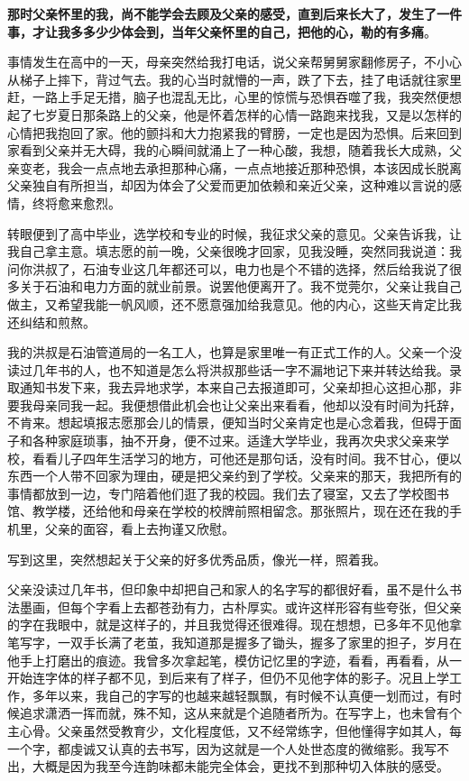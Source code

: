 \documentclass[UTF8,a4paper,8pt]{ctexbook}
\begin{document}
		\textbf{那时父亲怀里的我，尚不能学会去顾及父亲的感受，直到后来长大了，发生了一件事，才让我多多少少体会到，当年父亲怀里的自己，把他的心，勒的有多痛}。
		
		事情发生在高中的一天，母亲突然给我打电话，说父亲帮舅舅家翻修房子，不小心从梯子上摔下，背过气去。我的心当时就懵的一声，跌了下去，挂了电话就往家里赶，一路上手足无措，脑子也混乱无比，心里的惊慌与恐惧吞噬了我，我突然便想起了七岁夏日那条路上的父亲，他是怀着怎样的心情一路跑来找我，又是以怎样的心情把我抱回了家。他的颤抖和大力抱紧我的臂膀，一定也是因为恐惧。后来回到家看到父亲并无大碍，我的心瞬间就涌上了一种心酸，我想，随着我长大成熟，父亲变老，我会一点点地去承担那种心痛，一点点地接近那种恐惧，本该因成长脱离父亲独自有所担当，却因为体会了父爱而更加依赖和亲近父亲，这种难以言说的感情，终将愈来愈烈。
		
		转眼便到了高中毕业，选学校和专业的时候，我征求父亲的意见。父亲告诉我，让我自己拿主意。填志愿的前一晚，父亲很晚才回家，见我没睡，突然同我说道：我问你洪叔了，石油专业这几年都还可以，电力也是个不错的选择，然后给我说了很多关于石油和电力方面的就业前景。说罢他便离开了。我不觉莞尔，父亲让我自己做主，又希望我能一帆风顺，还不愿意强加给我意见。他的内心，这些天肯定比我还纠结和煎熬。
		
		我的洪叔是石油管道局的一名工人，也算是家里唯一有正式工作的人。父亲一个没读过几年书的人，也不知道是怎么将洪叔那些话一字不漏地记下来并转达给我。录取通知书发下来，我去异地求学，本来自己去报道即可，父亲却担心这担心那，非要我母亲同我一起。我便想借此机会也让父亲出来看看，他却以没有时间为托辞，不肯来。想起填报志愿那会儿的情景，便知当时父亲肯定也是心念着我，但碍于面子和各种家庭琐事，抽不开身，便不过来。适逢大学毕业，我再次央求父亲来学校，看看儿子四年生活学习的地方，可他还是那句话，没有时间。我不甘心，便以东西一个人带不回家为理由，硬是把父亲约到了学校。父亲来的那天，我把所有的事情都放到一边，专门陪着他们逛了我的校园。我们去了寝室，又去了学校图书馆、教学楼，还给他和母亲在学校的校牌前照相留念。那张照片，现在还在我的手机里，父亲的面容，看上去拘谨又欣慰。
		
		写到这里，突然想起关于父亲的好多优秀品质，像光一样，照着我。
		
		父亲没读过几年书，但印象中却把自己和家人的名字写的都很好看，虽不是什么书法墨画，但每个字看上去都苍劲有力，古朴厚实。或许这样形容有些夸张，但父亲的字在我眼中，就是这样子的，并且我觉得还很难得。现在想想，已多年不见他拿笔写字，一双手长满了老茧，我知道那是握多了锄头，握多了家里的担子，岁月在他手上打磨出的痕迹。我曾多次拿起笔，模仿记忆里的字迹，看看，再看看，从一开始连字体的样子都不见，到后来有了样子，但仍不见他字体的影子。况且上学工作，多年以来，我自己的字写的也越来越轻飘飘，有时候不认真便一划而过，有时候追求潇洒一挥而就，殊不知，这从来就是个追随者所为。在写字上，也未曾有个主心骨。父亲虽然受教育少，文化程度低，又不经常练字，但他懂得字如其人，每一个字，都虔诚又认真的去书写，因为这就是一个人处世态度的微缩影。我写不出，大概是因为我至今连韵味都未能完全体会，更找不到那种切入体肤的感受。
		
\end{document}
